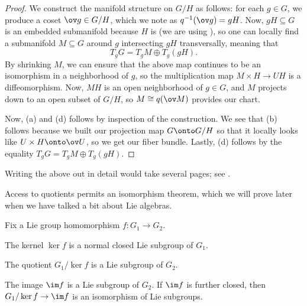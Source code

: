 \documentclass[../notes.tex]{subfiles}
\begin{document}
\begin{proof}
	We construct the manifold structure on $G/H$ as follows: for each $g\in G$, we produce a coset $\ov g\in G/H$, which we note as $q^{-1}(\ov g)=gH$. Now, $gH\subseteq G$ is an embedded submanifold because $H$ is (we are using ), so one can locally find a submanifold $M\subseteq G$ around $g$ intersecting $gH$ transversally, meaning that
	\[T_gG=T_gM\oplus T_g(gH).\]
	By shrinking $M$, we can ensure that the above map continues to be an isomorphism in a neighborhood of $g$, so the multiplication map $M\times H\to UH$ is a diffeomorphism. Now, $MH$ is an open neighborhood of $g\in G$, and $M$ projects down to an open subset of $G/H$, so $M\cong q(\ov M)$ provides our chart.

	Now, (a) and (d) follows by inspection of the construction. We see that (b) follows because we built our projection map $G\onto G/H$ so that it locally looks like $U\times H\onto\ov U$, so we get our fiber bundle. Lastly, (d) follows by the equality $T_gG=T_gM\oplus T_g(gH)$.
\end{proof}
\begin{remark}
	Writing the above out in detail would take several pages; see \cite[Theorem~21.10]{lee-manifolds}.
\end{remark}
Access to quotients permits an isomorphism theorem, which we will prove later when we have talked a bit about Lie algebras.
\begin{theorem}[Isomorphism] \label{thm:isomorphism}
	Fix a Lie group homomorphism $f\colon G_1\to G_2$.
	\begin{listalph}
		\item The kernel $\ker f$ is a normal closed Lie subgroup of $G_1$.
		\item The quotient $G_1/\ker f$ is a Lie subgroup of $G_2$.
		\item The image $\im f$ is a Lie subgroup of $G_2$. If $\im f$ is further closed, then $G_1/\ker f\to\im f$ is an isomorphism of Lie subgroups.
	\end{listalph}
\end{theorem}
\end{document}
